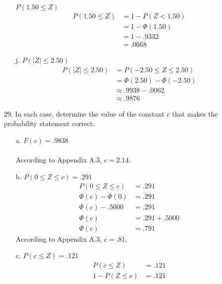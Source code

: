 \documentclass[letterpaper,12pt]{article}
\begin{document}
\begin{enumerate}
\begin{enumerate}
        $P(1.50 \le Z)$
        \begin{align*}
          P(1.50 \le Z) &= 1 - P(Z < 1.50) \\
          &= 1 - \Phi(1.50) \\
          &= 1 - .9332 \\
          &= .0668
        \end{align*}
        \begin{center}
        \end{center}
      \item[j.]
        $P(|Z| \le 2.50)$
        \begin{align*}
          P(|Z| \le 2.50) &= P(-2.50 \le Z \le 2.50) \\
          &= \Phi(2.50) - \Phi(-2.50) \\
          &\approx .9938 - .0062 \\
          &\approx .9876
        \end{align*}
        \begin{center}
        \end{center}
    \end{enumerate}
  \item[29.]
    In each case, determine the value of the constant $c$ that makes the probability statement correct.
    \begin{enumerate}
      \item[a.]
        $F(c) = .9838$ \\
        \\
        According to Appendix A.3, $c = 2.14$.
      \item[b.]
        $P(0 \le Z \le c) = .291$
        \begin{align*}
          P(0 \le Z \le c) &= .291 \\
          \Phi(c) - \Phi(0) &= .291 \\
          \Phi(c) - .5000 &= .291 \\
          \Phi(c) &= .291 + .5000 \\
          \Phi(c) &= .791
        \end{align*}
        According to Appendix A.3, $c = .81$.
      \item[c.]
        $P(c \le Z) = .121$
        \begin{align*}
          P(c \le Z) &= .121 \\
          1 - P(Z \le c) &= .121 \\

\end{align*}
\end{enumerate}
\end{enumerate}
\end{document}
